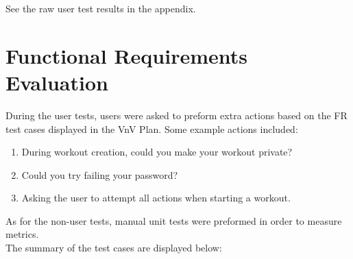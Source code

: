 \documentclass[12pt, titlepage]{article}
\begin{document}
See the raw user test results in the appendix.

\section{Functional Requirements Evaluation}


\noindent During the user tests, users were asked to preform extra actions based on the FR test cases displayed in the VnV Plan.
Some example actions included: \\
\begin{enumerate}
    \item During workout creation, could you make your workout private?
    \item Could you try failing your password?
    \item Asking the user to attempt all actions when starting a workout.
\end{enumerate}


\noindent As for the non-user tests, manual unit tests were preformed in order to measure metrics.\\


\noindent The summary of the test cases are displayed below:
\end{document}
